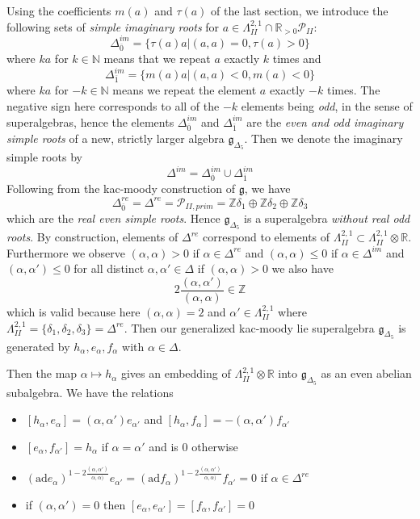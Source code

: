 \documentclass[9pt]{amsart} \usepackage[utf8]{inputenc}
\newcommand{\N}{\mathbb{N}}
\newcommand{\Z}{\mathbb{Z}} \newcommand{\C}{\mathbb{C}}
\newcommand{\R}{\mathbb{R}} \newcommand{\La}{\Lambda}
\newcommand{\Poly}{\mathcal{P}}
\newcommand{\bkm}{\mathfrak{g}}
\newcommand{\autcor}{\mathfrak{g}_{\Delta_5}}
\begin{document}
Using the coefficients $m(a)$ and $\tau(a)$ of the last section, we
introduce the following sets of \textit{simple imaginary roots} for $a \in
\La^{2,1}_{II} \cap \R_{>0} \Poly_{II}$:
$$\Delta_{\overline{0}}^{im} = \{\tau(a)a | (a,a) = 0,\tau(a)>0\}$$
where $ka$ for $k\in \N$ means that we repeat $a$ exactly $k$ times and
$$\Delta_{\overline{1}}^{im} = \{ m(a)a | (a,a) < 0 , m(a)< 0\}$$
where $ka$ for $-k \in \N$ means we repeat the element $a$ exactly $-k$
times. The negative sign here corresponds to all of the $-k$ elements
being \textit{odd}, in the sense of superalgebras, hence the elements
$\Delta_{\overline{0}}^{im}$ and $\Delta_{\overline{1}}^{im}$ are the
\textit{even and odd imaginary simple roots} of a new, strictly larger algebra
$\mathfrak{g}_{\Delta_5}$.
Then we denote the imaginary simple roots by $$\Delta^{im} =
\Delta_{\overline{0}}^{im} \cup \Delta_{\overline{1}}^{im}$$
Following from the kac-moody construction of $\bkm$, we
have $$\Delta_{\overline{0}}^{re} = \Delta^{re} = \Poly_{II,prim} =
\Z\delta_1 \oplus \Z\delta_2 \oplus \Z\delta_3$$ which are
the \textit{real even simple roots}. Hence
$\autcor$ is a superalgebra \textit{without real odd
roots}. By construction, elements of $\Delta^{re}$ correspond to
elements of $\La^{2,1}_{II} \subset \La^{2,1}_{II}\otimes \R$.
Furthermore we observe $(\alpha,\alpha) > 0$ if $\alpha \in \Delta^{re}$
and $(\alpha,\alpha) \leq 0$ if $\alpha \in \Delta^{im}$ and
$(\alpha,\alpha') \leq 0$ for all distinct $\alpha, \alpha' \in \Delta$ if
$(\alpha,\alpha) > 0$ we also have
$$2\frac{(\alpha,\alpha')}{(\alpha,\alpha)} \in \Z$$ which is valid
because here $(\alpha,\alpha) = 2$ and $\alpha' \in \La^{2,1}_{II}$
where $\La^{2,1}_{II} = \{\delta_1,\delta_2,\delta_3\} = \Delta^{re}$.
Then our generalized kac-moody lie superalgebra
$\autcor$ is generated by $h_{\alpha},
e_{\alpha}, f_{\alpha}$ with $\alpha \in \Delta$.


Then the map $\alpha \mapsto h_{\alpha}$ gives an embedding of
$\La^{2,1}_{II}\otimes\R$ into $\autcor$ as an
even abelian subalgebra. We have the relations

\begin{itemize}
\item $[h_{\alpha}, e_{\alpha}] = (\alpha, \alpha')e_{\alpha'}$ and
$[h_{\alpha}, f_{\alpha}] = -(\alpha, \alpha')f_{\alpha'}$
\item $[e_{\alpha}, f_{\alpha'}] = h_{\alpha}$ if $\alpha = \alpha'$ and
is $0$ otherwise
\item $(\textrm{ad} e_{\alpha})^{1-
2\frac{(\alpha,\alpha')}{\alpha,\alpha)}}e_{\alpha'} = (\textrm{ad}
f_{\alpha})^{1- 2\frac{(\alpha,\alpha')}{\alpha,\alpha)}}f_{\alpha'} = 0$
if $\alpha \in \Delta^{re}$
\item if $(\alpha,\alpha') = 0$ then $[e_{\alpha}, e_{\alpha'}] =
[f_{\alpha},f_{\alpha'}] = 0$
\end{itemize}
\end{document}
